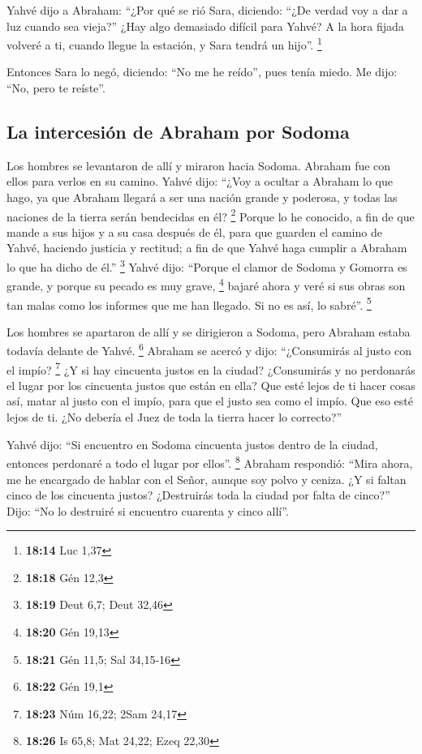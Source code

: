 \begin{paracol}{2}
 Yahvé dijo a Abraham: ``¿Por qué se rió Sara, diciendo:
``¿De verdad voy a dar a luz cuando sea vieja?''  ¿Hay
algo demasiado difícil para Yahvé? A la hora fijada volveré a ti, cuando
llegue la estación, y Sara tendrá un hijo''. \footnote{\textbf{18:14}
  Luc 1,37}

 Entonces Sara lo negó, diciendo: ``No me he reído'',
pues tenía miedo. Me dijo: ``No, pero te reíste''.

\hypertarget{la-intercesiuxf3n-de-abraham-por-sodoma}{%
\subsection{La intercesión de Abraham por
Sodoma}\label{la-intercesiuxf3n-de-abraham-por-sodoma}}

 Los hombres se levantaron de allí y miraron hacia
Sodoma. Abraham fue con ellos para verlos en su camino. 
Yahvé dijo: ``¿Voy a ocultar a Abraham lo que hago,  ya
que Abraham llegará a ser una nación grande y poderosa, y todas las
naciones de la tierra serán bendecidas en él? \footnote{\textbf{18:18}
  Gén 12,3}  Porque lo he conocido, a fin de que mande a
sus hijos y a su casa después de él, para que guarden el camino de
Yahvé, haciendo justicia y rectitud; a fin de que Yahvé haga cumplir a
Abraham lo que ha dicho de él.'' \footnote{\textbf{18:19} Deut 6,7; Deut
  32,46}  Yahvé dijo: ``Porque el clamor de Sodoma y
Gomorra es grande, y porque su pecado es muy grave, \footnote{\textbf{18:20}
  Gén 19,13}  bajaré ahora y veré si sus obras son tan
malas como los informes que me han llegado. Si no es así, lo sabré''.
\footnote{\textbf{18:21} Gén 11,5; Sal 34,15-16}

 Los hombres se apartaron de allí y se dirigieron a
Sodoma, pero Abraham estaba todavía delante de Yahvé. \footnote{\textbf{18:22}
  Gén 19,1}  Abraham se acercó y dijo: ``¿Consumirás al
justo con el impío? \footnote{\textbf{18:23} Núm 16,22; 2Sam 24,17}
 ¿Y si hay cincuenta justos en la ciudad? ¿Consumirás y
no perdonarás el lugar por los cincuenta justos que están en ella?
 Que esté lejos de ti hacer cosas así, matar al justo con
el impío, para que el justo sea como el impío. Que eso esté lejos de ti.
¿No debería el Juez de toda la tierra hacer lo correcto?''

 Yahvé dijo: ``Si encuentro en Sodoma cincuenta justos
dentro de la ciudad, entonces perdonaré a todo el lugar por ellos''.
\footnote{\textbf{18:26} Is 65,8; Mat 24,22; Ezeq 22,30} 
Abraham respondió: ``Mira ahora, me he encargado de hablar con el Señor,
aunque soy polvo y ceniza.  ¿Y si faltan cinco de los
cincuenta justos? ¿Destruirás toda la ciudad por falta de cinco?'' Dijo:
``No lo destruiré si encuentro cuarenta y cinco allí''.


\end{paracol}
